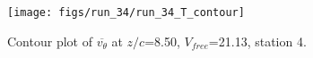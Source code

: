 \begin{figure}[H]
\centering
\texttt{[image: figs/run\_34/run\_34\_T\_contour]}
\caption{Contour plot of $\overline{v_{\theta}}$ at $z/c$=8.50, $V_{free}$=21.13, station 4.}
\label{fig:run_34_T_contour}
\end{figure}


